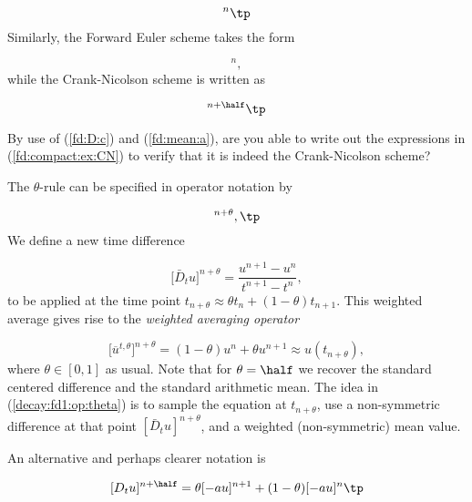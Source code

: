 \documentclass[graybox,sectrefs,envcountresetchap,open=right,final]{svmonodo}
\newenvironment{question_mdfboxadmon}[1][]{
\begin{question_mdfboxmdframed}[frametitle=#1]
}
{
\end{question_mdfboxmdframed}
}
\begin{document}
\begin{equation}
[D_t^- u  = -au]^n \tp
\end{equation}
Similarly, the Forward Euler scheme takes the form

\begin{equation}
[D_t^+ u  = -au]^n,
\end{equation}
while the Crank-Nicolson scheme is written as

\begin{equation}
[D_t u = -a\overline{u}^t]^{n+\half}\tp
\label{fd:compact:ex:CN}
\end{equation}


\begin{question_mdfboxadmon}[Question:]
By use of (\ref{fd:D:c}) and (\ref{fd:mean:a}), are you able to
write out the expressions in (\ref{fd:compact:ex:CN}) to verify that
it is indeed the Crank-Nicolson scheme?
\end{question_mdfboxadmon} %



The $\theta$-rule can be specified in operator notation by

\begin{equation}
[\bar D_t u = -a\overline{u}^{t,\theta}]^{n+\theta},\tp
\label{decay:fd1:op:theta}
\end{equation}
We define a new time difference

\begin{equation}
\lbrack\bar D_t u\rbrack^{n+\theta} = \frac{u^{n+1}-u^n}{t^{n+1}-t^n},
\label{decay:fd1:Du:theta}
\end{equation}
to be applied at the time point $t_{n+\theta}\approx\theta t_n + (1-\theta)t_{n+1}$. This weighted average gives rise to the
\emph{weighted averaging operator}

\begin{equation}
\lbrack\overline{u}^{t,\theta}\rbrack^{n+\theta} = (1-\theta)u^{n} + \theta u^{n+1}
\approx u(t_{n+\theta}),
\label{decay:fd1:wmean:a}
\end{equation}
where $\theta\in [0,1]$ as usual. Note that for $\theta =\half$ we recover
the standard centered difference and the standard arithmetic mean.
The idea in (\ref{decay:fd1:op:theta}) is to sample the equation at
$t_{n+\theta}$, use a non-symmetric difference at that
point $[\bar D_t u]^{n+\theta}$, and a weighted (non-symmetric) mean value.

An alternative and perhaps clearer notation is

\[ [D_t u]^{n+\half} = \theta [-au]^{n+1} + (1-\theta)[-au]^{n}\tp \]
\end{document}
